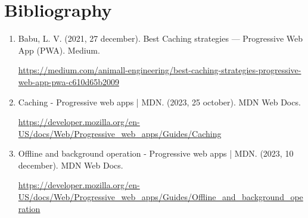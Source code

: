 \documentclass[12pt,a4paper]{article}
\begin{document}
    \clearpage

	\section{Bibliography}

    \begin{enumerate}
    
      \item Babu, L. V. (2021, 27 december). Best Caching strategies — Progressive Web App (PWA). Medium.
      
    \href{https://medium.com/animall-engineering/best-caching-strategies-progressive-web-app-pwa-c610d65b2009}{https://medium.com/animall-engineering/best-caching-strategies-progressive-web-app-pwa-c610d65b2009}

      \item Caching - Progressive web apps | MDN. (2023, 25 october). MDN Web Docs.
        
      \href{https://developer.mozilla.org/en-US/docs/Web/Progressive_web_apps/Guides/Caching}{https://developer.mozilla.org/en-US/docs/Web/Progressive_web_apps/Guides/Caching}

      \item Offline and background operation - Progressive web apps | MDN. (2023, 10 december). MDN Web Docs.
      
      \href{https://developer.mozilla.org/en-US/docs/Web/Progressive_web_apps/Guides/Offline_and_background_operation}{https://developer.mozilla.org/en-US/docs/Web/Progressive_web_apps/Guides/Offline_and_background_operation}
      
    \end{enumerate}
	
	
\end{document}
